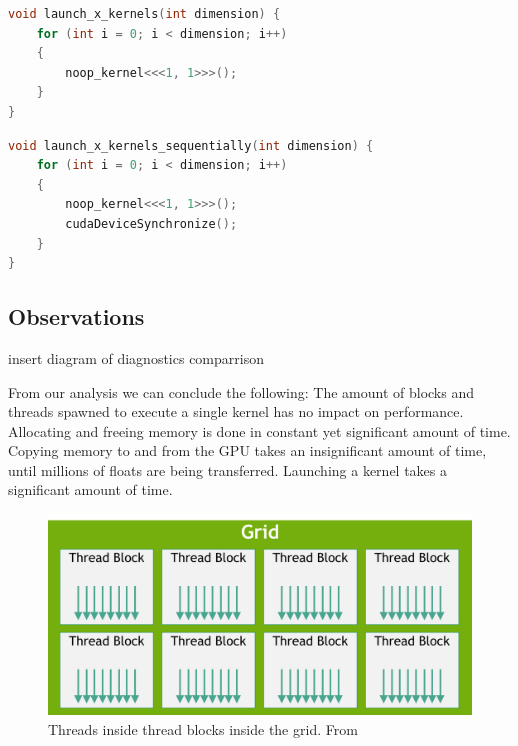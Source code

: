 \begin{lstlisting}[language=C, caption={Code to measure the launch of asynchronous kernels}, label={lst:asynchronous kernels}]
void launch_x_kernels(int dimension) {
    for (int i = 0; i < dimension; i++)
    {
        noop_kernel<<<1, 1>>>();
    }
}
\end{lstlisting}

\begin{lstlisting}[language=C, caption={Code to measure the launch of synchronous kernels}, label={lst:synchronous kernels}]
void launch_x_kernels_sequentially(int dimension) {
    for (int i = 0; i < dimension; i++)
    {
        noop_kernel<<<1, 1>>>();
        cudaDeviceSynchronize();
    }
}
\end{lstlisting}

\subsection{Observations}

\color{red}
insert diagram of diagnostics comparrison
\color{black}

From our analysis we can conclude the following: 
The amount of blocks and threads spawned to execute a single kernel has no impact on performance. 
Allocating and freeing memory is done in constant yet significant amount of time. 
Copying memory to and from the GPU takes an insignificant amount of time, until millions of floats are being transferred. 
Launching a kernel takes a significant amount of time. 

\begin{figure}[ht]
\includegraphics[width=\textwidth]{Documents/Report/Figures/Threads and blocks.png}
\caption{Threads inside thread blocks inside the grid. From \cite{nvidia:cudadoc}}
\label{fig:threads and blocks}
\end{figure}
